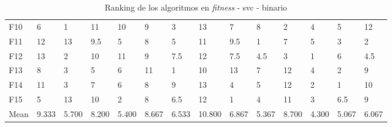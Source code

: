 \begin{table}
\begin{adjustbox}{width=\linewidth}
\begin{tabular}{llllllllllllll}
            F10  & 6     & 1     & 11    & 10    & 9     & 3     & 13     & 7     & 8     & 2     & 4     & 5     & 12    \\
            F11  & 12    & 13    & 9.5   & 5     & 8     & 5     & 11     & 9.5   & 1     & 7     & 5     & 3     & 2     \\
            F12  & 13    & 2     & 10    & 11    & 9     & 7.5   & 12     & 7.5   & 4.5   & 3     & 1     & 6     & 4.5   \\
            F13  & 8     & 3     & 5     & 6     & 11    & 1     & 10     & 13    & 7     & 12    & 4     & 2     & 9     \\
            F14  & 11    & 3     & 7     & 6     & 8     & 9     & 13     & 4     & 5     & 12    & 2     & 1     & 10    \\
            F15  & 5     & 13    & 10    & 2     & 8     & 6.5   & 12     & 1     & 4     & 11    & 3     & 6.5   & 9     \\
            Mean & 9.333 & 5.700 & 8.200 & 5.400 & 8.667 & 6.533 & 10.800 & 6.867 & 5.367 & 8.700 & 4.300 & 5.067 & 6.067 \\
            \bottomrule
        \end{tabular}
    \end{adjustbox}
    \caption{Ranking de los algoritmos en \textit{fitness} - svc - binario}
    \label{tab:ranking_fitness_bin_svc}
\end{table}

